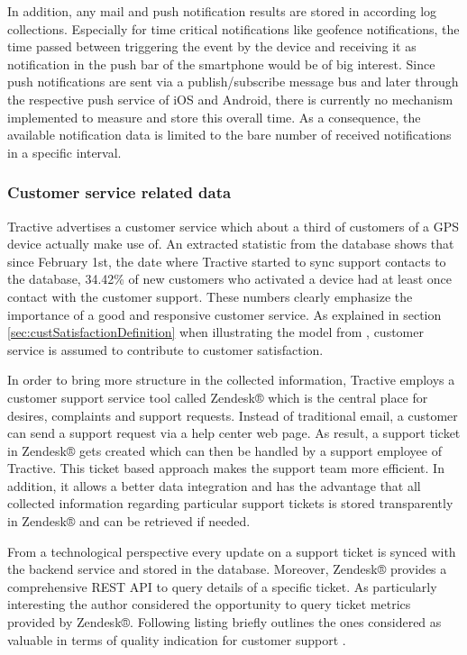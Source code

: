 In addition, any mail and push notification results are stored in according log collections. 
Especially for time critical notifications like geofence notifications, the time passed between triggering the event by the device and receiving it as notification in the push bar of the smartphone would be of big interest. Since push notifications are sent via a publish/subscribe message bus and later through the respective push service of iOS and Android, there is currently no mechanism implemented to measure and store this overall time. As a consequence, the available notification data is limited to the bare number of received notifications in a specific interval. 

\subsubsection{Customer service related data}
Tractive advertises a customer service which about a third of customers of a GPS device actually make use of. An extracted statistic from the database shows that since February 1st, the date where Tractive started to sync support contacts to the database, 34.42\% of new customers who activated a device had at least once contact with the customer support. These numbers clearly emphasize the importance of a good and responsive customer service. As explained in section \ref{sec:custSatisfactionDefinition} when illustrating the model from \cite{johnson2001evolution}, customer service is assumed to contribute to customer satisfaction. 

In order to bring more structure in the collected information, Tractive employs a customer support service tool called Zendesk® which is the central place for desires, complaints and support requests. Instead of traditional email, a customer can send a support request via a help center web page. As result, a support ticket in Zendesk® gets created which can then be handled by a support employee of Tractive. This ticket based approach makes the support team more efficient. In addition, it allows a better data integration and has the advantage that all collected information regarding particular support tickets is stored transparently in Zendesk® and can be retrieved if needed.

From a technological perspective every update on a support ticket is synced with the backend service and stored in the database. Moreover, Zendesk® provides a comprehensive REST API to query details of a specific ticket. As particularly interesting the author considered the opportunity to query ticket metrics provided by Zendesk®. Following listing briefly outlines the ones considered as valuable in terms of quality indication for customer support \cite{zendeskWeb}.

